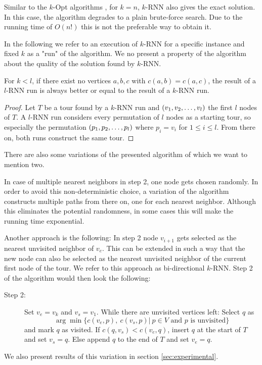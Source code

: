 Similar to the $k$-Opt algorithms \cite{CROES1958, LIN1973}, for $k = n$, $k$-RNN also gives the exact solution. In this case, the algorithm degrades to a plain brute-force search.
Due to the running time of $O(n!)$ this is not the preferable way to obtain it.

In the following we refer to an execution of $k$-RNN for a specific instance and fixed $k$ as a "run" of the algorithm.
We no present a property of the algorithm about the quality of the solution found by $k$-RNN.
\begin{theorem}
	\label{theo:quality}
	For $k < l$, if there exist no vertices $a, b, c$ with $c(a, b) = c(a, c)$, the result of a $l$-RNN run is always better or equal to the result of a $k$-RNN run.
\end{theorem}
\begin{proof}
	Let $T$ be a tour found by a $k$-RNN run and $(v_1, v_2, \mathellipsis, v_l)$ the first $l$ nodes of $T$. 
	A $l$-RNN run considers every permutation of $l$ nodes as a starting tour, so especially the permutation $(p_1, p_2, \mathellipsis, p_l)$ where $p_i = v_i$ for $1 \leq i \leq l$. 
	From there on, both runs construct the same tour.
\end{proof}

There are also some variations of the presented algorithm of which we want to mention two.

In case of multiple nearest neighbors in step 2, one node gets chosen randomly. 
In order to avoid this non-deterministic choice, a variation of the algorithm constructs multiple paths from there on, one for each nearest neighbor. 
Although this eliminates the potential randomness, in some cases this will make the running time exponential.

Another approach is the following:
In step 2 node $v_{i+1}$ gets selected as the nearest unvisited neighbor of $v_e$. 
This can be extended in such a way that the new node can also be selected as the nearest unvisited neighbor of the current first node of the tour. 
We refer to this approach as bi-directional $k$-RNN. Step 2 of the algorithm would then look the following:

\begin{description}
	\item[Step 2:] Set $v_e = v_k$ and $v_s = v_1$. 
	While there are unvisited vertices left: 
	Select $q$ as 
	\[
	\arg \min\{c(v_e, p),\ c(v_s, p) |\ p \in V \text{ and $p$ is unvisited}\}
	\] 
	and mark $q$ as visited. If $c(q, v_s) < c (v_e, q)$, insert $q$ at the start of $T$ and set $v_s = q$. Else append $q$ to the end of $T$ and set $v_e = q$.
\end{description}

We also present results of this variation in section \ref{sec:experimental}.

